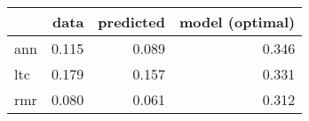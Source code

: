 \begin{tabular}{lrrr}
\toprule
{} &   data &  predicted &  model (optimal) \\
\midrule
ann &  0.115 &      0.089 &            0.346 \\
ltc &  0.179 &      0.157 &            0.331 \\
rmr &  0.080 &      0.061 &            0.312 \\
\bottomrule
\end{tabular}
